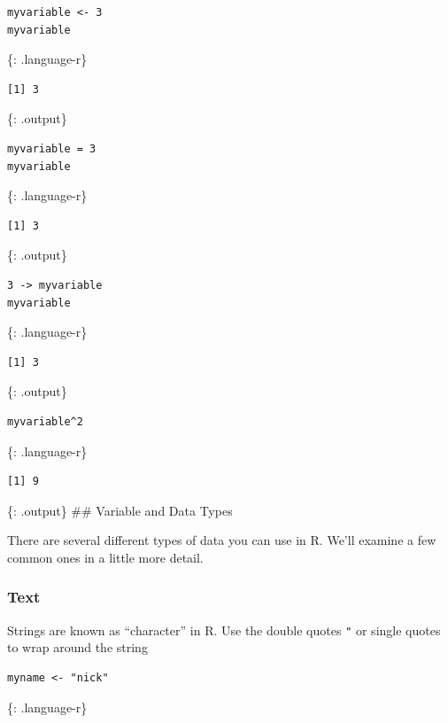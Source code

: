 \documentclass[]{article}
\begin{document}
\begin{verbatim}
myvariable <- 3
myvariable
\end{verbatim}

\{: .language-r\}

\begin{verbatim}
[1] 3
\end{verbatim}

\{: .output\}

\begin{verbatim}
myvariable = 3
myvariable
\end{verbatim}

\{: .language-r\}

\begin{verbatim}
[1] 3
\end{verbatim}

\{: .output\}

\begin{verbatim}
3 -> myvariable
myvariable
\end{verbatim}

\{: .language-r\}

\begin{verbatim}
[1] 3
\end{verbatim}

\{: .output\}

\begin{verbatim}
myvariable^2
\end{verbatim}

\{: .language-r\}

\begin{verbatim}
[1] 9
\end{verbatim}

\{: .output\} \#\# Variable and Data Types

There are several different types of data you can use in R. We'll
examine a few common ones in a little more detail.

\subsubsection{Text}\label{text}

Strings are known as ``character'' in R. Use the double quotes
\texttt{"} or single quotes \texttt{\textquotesingle{}} to wrap around
the string

\begin{verbatim}
myname <- "nick"
\end{verbatim}

\{: .language-r\}
\end{document}

